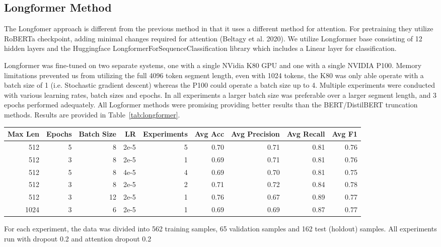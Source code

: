 \documentclass[twocolumn,10pt]{wmrDoc}
\begin{document}
\subsection{Longformer Method}
The Longfomer approach is different from the previous method in that it uses a different method for attention. For pretraining they utilize RoBERTa \cite{roberta} checkpoint, adding minimal changes required for attention (Beltagy et al. 2020). We utilize Longformer base consisting of 12 hidden layers and the Huggingface LongformerForSequenceClassification library which includes a Linear layer for classification.

Longformer was fine-tuned on two separate systems, one with a single NVidia K80 GPU and one with a single NVIDIA P100. Memory limitations prevented us from utilizing the full 4096 token segment length, even with 1024 tokens, the K80 was only able operate with a batch size of 1 (i.e. Stochastic gradient descent) whereas the P100 could operate a batch size up to 4. Multiple experiments were conducted with various learning rates, batch sizes and epochs. In all experiments a larger batch size was preferable over a larger segment length, and 3 epochs performed adequately. All Logformer methods were promising providing better results than the BERT/DistilBERT truncation methods. Results are provided in Table~\ref{tab:longformer}.

\begin{table*}
 \caption{Longformer Experiments}
  \centering
  \begin{tabular}{rrrrrrrrr}
    \toprule
    Max Len & Epochs & Batch Size & LR & Experiments & Avg Acc & Avg Precision & Avg Recall & Avg F1 \\
    \midrule
    512 & 5 & 8  & 2e-5 & 5 & 0.70 & 0.71 & 0.81 & 0.76 \\
    512 & 3 & 8  & 2e-5 & 1 & 0.69 & 0.71 & 0.81 & 0.76 \\
    512 & 5 & 8  & 4e-5 & 4 & 0.69 & 0.70 & 0.81 & 0.75 \\
    512 & 3 & 8  & 2e-5 & 2 & 0.71 & 0.72 & 0.84 & 0.78 \\
    512 & 3 & 12 & 2e-5 & 1 & 0.76 & 0.67 & 0.89 & 0.77 \\
    1024 & 3 & 6 & 2e-5 & 1 & 0.69 & 0.69 & 0.87 & 0.77 \\
    \bottomrule
  \end{tabular}
  \label{tab:longformer}
\end{table*}

For each experiment, the data was divided into 562 training samples, 65 validation samples and 162 test (holdout) samples. All experiments run with dropout 0.2 and attention dropout 0.2
\end{document}

